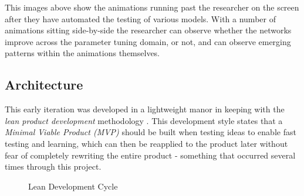 \documentclass[a4paper,11pt,titlepage]{article}
\begin{document}
	\begin{figure}[H]
    			\centering	
    			\qquad
    			\caption{ }%
    			\label{fig:design}
		\end{figure}	
	
	This images above show the animations running past the researcher on the screen after they have automated the testing of various models. With a number of animations sitting side-by-side the researcher can observe whether the networks improve across the parameter tuning domain, or not, and can observe emerging patterns within the animations themselves.
	
	\subsection{Architecture}
	This early iteration was developed in a lightweight manor in keeping with the \textit{lean product development} methodology \cite{Blank2013}. This development style states that a \textit{Minimal Viable Product (MVP)} should be built when testing ideas to enable fast testing and learning, which can then be reapplied to the product later without fear of completely rewriting the entire product - something that occurred several times through this project.
	\par 
		
	\begin{figure}[H]
    			\caption{Lean Development Cycle}%
	\end{figure}	
	
\end{document}
